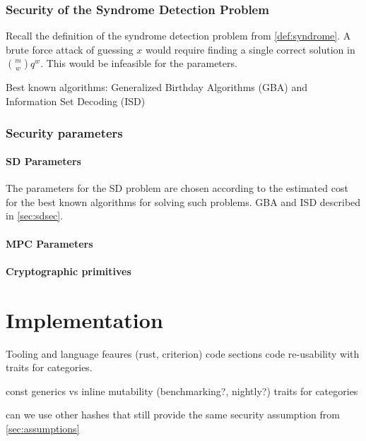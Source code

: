 \documentclass[twoside,11pt,openright]{report}
\theoremstyle{definition}
\theoremstyle{plain}
\begin{document}
\subsection{Security of the Syndrome Detection Problem}
\label{sec:sdsec}

Recall the definition of the syndrome detection problem from \autoref{def:syndrome}. A brute force attack of guessing $x$ would require finding a single correct solution in $\binom{m}{w} q^w$. This would be infeasible for the parameters.

Best known algorithms: Generalized Birthday Algorithms (GBA) and Information Set Decoding (ISD)

\subsection{Security parameters}
\label{sec:secparam}

\subsubsection{SD Parameters}
\label{sec:sdparam}

The parameters for the SD problem are chosen according to the estimated cost for the best known algorithms for solving such problems. GBA and ISD described in \autoref{sec:sdsec}.

\subsubsection{MPC Parameters}

\subsubsection{Cryptographic primitives}



\chapter{Implementation}
\label{ch:impl}

Tooling and language feaures (rust, criterion)
code sections
code re-usability with traits for categories.

const generics vs inline mutability (benchmarking?, nightly?)
traits for categories

can we use other hashes that still provide the same security assumption from \autoref{sec:assumptions}
\end{document}
